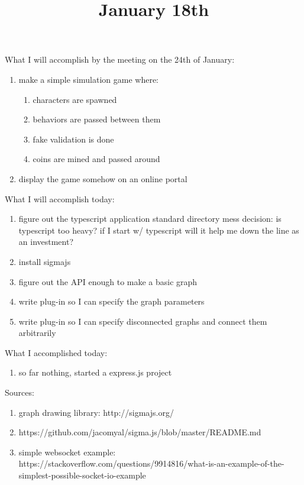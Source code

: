 \title{January 18th}


What I will accomplish by the meeting on the 24th of January:

\begin{enumerate}
	\item make a simple simulation game where:
		\begin{enumerate}
			\item characters are spawned
			\item behaviors are passed between them
			\item fake validation is done 
			\item coins are mined and passed around
		\end{enumerate}
	\item display the game somehow on an online portal
\end{enumerate}

What I will accomplish today:

\begin{enumerate}
	\item figure out the typescript application standard directory mess
		decision: is typescript too heavy?
		if I start w/ typescript will it help me down the line as an investment?
	\item install sigmajs
	\item figure out the API enough to make a basic graph
	\item write plug-in so I can specify the graph parameters
	\item write plug-in so I can specify disconnected graphs and connect them arbitrarily
\end{enumerate}


What I accomplished today:

\begin{enumerate}
	\item so far nothing, started a express.js project
\end{enumerate}

Sources:

\begin{enumerate}
	\item graph drawing library: http://sigmajs.org/
	\item https://github.com/jacomyal/sigma.js/blob/master/README.md
	\item simple websocket example: https://stackoverflow.com/questions/9914816/what-is-an-example-of-the-simplest-possible-socket-io-example
\end{enumerate}



